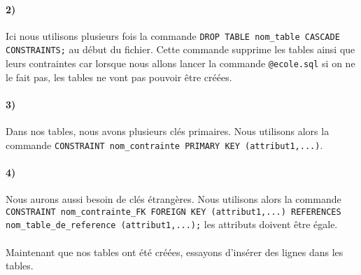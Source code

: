 \documentclass{report}
\begin{document}
\paragraph{2)}Ici nous utilisons plusieurs fois la commande {\tt DROP TABLE nom\_table CASCADE CONSTRAINTS;} au début du fichier. Cette commande supprime les tables ainsi que leurs contraintes car lorsque nous allons lancer la commande {\tt @ecole.sql} si on ne le fait pas, les tables ne vont pas pouvoir être créées.

\paragraph{3)}Dans nos tables, nous avons plusieurs clés primaires. Nous utilisons alors la commande {\tt CONSTRAINT \newline nom\_contrainte PRIMARY KEY (attribut1,...)}.

\paragraph{4)}Nous aurons aussi besoin de clés étrangères. Nous utilisons alors la commande {\tt CONSTRAINT nom\_contrainte\_FK FOREIGN KEY (attribut1,...) REFERENCES nom\_table\_de\_reference (attribut1,...);} les attributs doivent être égale.

\paragraph{}Maintenant que nos tables ont été créées, essayons d'insérer des lignes dans les tables.
\end{document}
